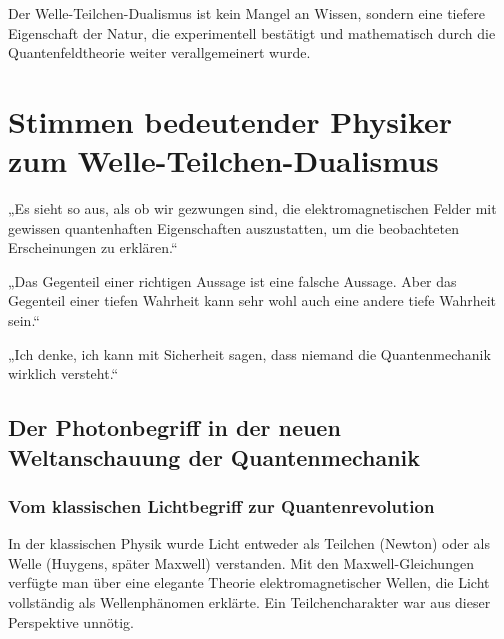 Der Welle-Teilchen-Dualismus ist kein Mangel an Wissen, sondern eine tiefere Eigenschaft der Natur, die experimentell bestätigt und mathematisch durch die Quantenfeldtheorie weiter verallgemeinert wurde.


\section*{Stimmen bedeutender Physiker zum Welle-Teilchen-Dualismus}

\begin{tcolorbox}[physikbox, title={Albert Einstein, (1909)\cite{einstein1909}}]
	\label{box:einstein1909}
	„Es sieht so aus, als ob wir gezwungen sind, die elektromagnetischen Felder mit gewissen quantenhaften Eigenschaften auszustatten, um die beobachteten Erscheinungen zu erklären.“
\end{tcolorbox}

\begin{tcolorbox}[physikbox, title={Niels Bohr (1933)\cite{bohr1933}}]
	\label{box:bohr1933}
	„Das Gegenteil einer richtigen Aussage ist eine falsche Aussage. Aber das Gegenteil einer tiefen Wahrheit kann sehr wohl auch eine andere tiefe Wahrheit sein.“\\
\end{tcolorbox}

\begin{tcolorbox}[physikbox, title={Richard P. Feynman (1965) \cite{feynman1965}}]
	\label{box:feynman1965}
	„Ich denke, ich kann mit Sicherheit sagen, dass niemand die Quantenmechanik wirklich versteht.“\\
\end{tcolorbox}

\subsection{Der Photonbegriff in der neuen Weltanschauung der Quantenmechanik}

\subsubsection{Vom klassischen Lichtbegriff zur Quantenrevolution}

In der klassischen Physik wurde Licht entweder als Teilchen (Newton) oder als Welle (Huygens, später Maxwell) verstanden. Mit den Maxwell-Gleichungen verfügte man über eine elegante Theorie elektromagnetischer Wellen, die Licht vollständig als Wellenphänomen erklärte. Ein Teilchencharakter war aus dieser Perspektive unnötig.

